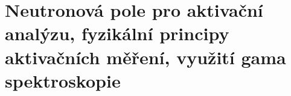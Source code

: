 \section[Aktivační měření, gama spektrometrie]{Neutronová pole pro aktivační analýzu, fyzikální principy aktivačních měření, využití gama spektroskopie}

